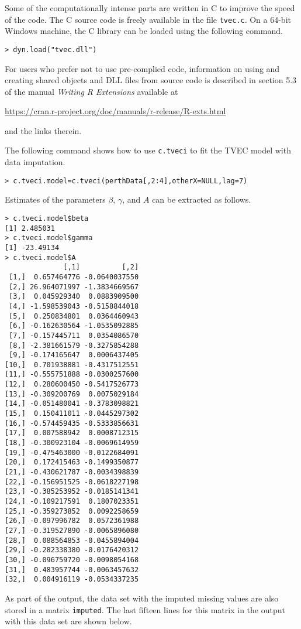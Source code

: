 \documentclass[12pt]{article}
\begin{document}
Some of the computationally intense parts are written in C to improve the speed of the code.  The C source code is freely available in the file {\tt tvec.c}.  
On a 64-bit Windows machine, the C library can be loaded using the following command.
\begin{verbatim}
> dyn.load("tvec.dll")
\end{verbatim}
For users who prefer not to use pre-complied code, information on using and creating shared objects and DLL files from source code is described in section 5.3 of the manual {\it Writing R Extensions} available at 

\noindent \url{https://cran.r-project.org/doc/manuals/r-release/R-exts.html}

\noindent and the links therein.

The following command shows how to use {\tt c.tveci} to fit the TVEC model with data imputation.  
\begin{verbatim}
> c.tveci.model=c.tveci(perthData[,2:4],otherX=NULL,lag=7)
\end{verbatim}
Estimates of the parameters $\beta$, $\gamma$, and $A$ can be extracted as follows.
\begin{verbatim}
> c.tveci.model$beta
[1] 2.485031
> c.tveci.model$gamma
[1] -23.49134
> c.tveci.model$A
              [,1]          [,2]
 [1,]  0.657464776 -0.0640037550
 [2,] 26.964071997 -1.3834669567
 [3,]  0.045929340  0.0883909500
 [4,] -1.598539043 -0.5158844018
 [5,]  0.250834801  0.0364460943
 [6,] -0.162630564 -1.0535092885
 [7,] -0.157445711  0.0354086570
 [8,] -2.381661579 -0.3275854288
 [9,] -0.174165647  0.0006437405
[10,]  0.701938881 -0.4317512551
[11,] -0.555751888 -0.0300257600
[12,]  0.280600450 -0.5417526773
[13,] -0.309200769  0.0075029184
[14,] -0.051480041 -0.3783098821
[15,]  0.150411011 -0.0445297302
[16,] -0.574459435 -0.5333856631
[17,]  0.007588942  0.0008712315
[18,] -0.300923104 -0.0069614959
[19,] -0.475463000 -0.0122684091
[20,]  0.172415463 -0.1499350877
[21,] -0.430621787 -0.0034398839
[22,] -0.156951525 -0.0618227198
[23,] -0.385253952 -0.0185141341
[24,] -0.109217591  0.1807023351
[25,] -0.359273852  0.0092258659
[26,] -0.097996782  0.0572361988
[27,] -0.319527890 -0.0065896080
[28,]  0.088564853 -0.0455894004
[29,] -0.282338380 -0.0176420312
[30,] -0.096759720 -0.0098054168
[31,]  0.483957744 -0.0063457632
[32,]  0.004916119 -0.0534337235
\end{verbatim}
As part of the output, the data set with the imputed missing values are also stored in a matrix {\tt imputed}.  The last fifteen lines for this matrix in the output with this data set are shown below.
\end{document}

